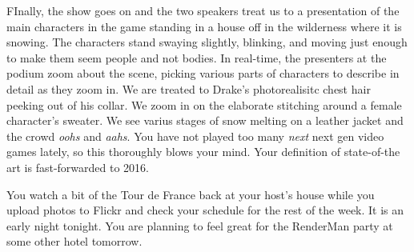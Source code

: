 \documentclass[../main.tex]{subfiles}
\begin{document}
FInally, the show goes on and the two speakers treat us to a presentation of the main characters in the game standing in a house off in the wilderness where it is snowing. The characters stand swaying slightly, blinking, and moving just enough to make them seem people and not bodies. In real-time, the presenters at the podium zoom about the scene, picking various parts of characters to describe in detail as they zoom in. We are treated to Drake's photorealisitc chest hair peeking out of his collar. We zoom in on the elaborate stitching around a female character's sweater. We see varius stages of snow melting on a leather jacket and the crowd \textit{oohs} and \textit{aahs}. You have not played too many \textit{next} next gen video games lately, so this thoroughly blows your mind. Your definition of state-of-the art is fast-forwarded to 2016.

You watch a bit of the Tour de France back at your host's house while you upload photos to Flickr and check your schedule for the rest of the week. It is an early night tonight. You are planning to feel great for the RenderMan party at some other hotel tomorrow.
\end{document}
